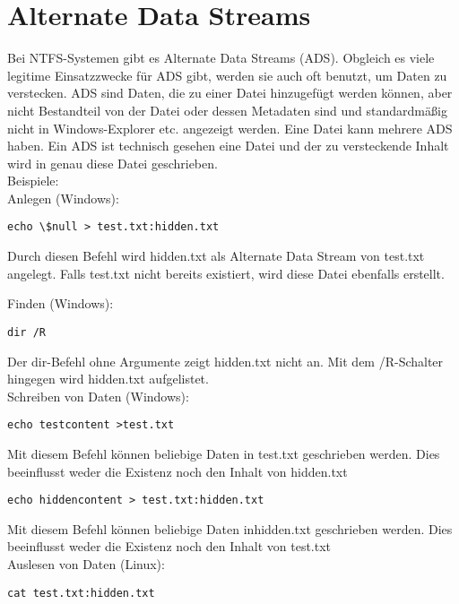 \section{Alternate Data Streams}
Bei NTFS-Systemen gibt es Alternate Data Streams (ADS). Obgleich es viele legitime Einsatzzwecke für ADS gibt, werden sie auch oft benutzt, um Daten zu verstecken. ADS sind Daten, die zu einer Datei hinzugefügt werden können, aber nicht Bestandteil von der Datei oder dessen Metadaten sind und standardmäßig nicht in Windows-Explorer etc. angezeigt werden. Eine Datei kann mehrere ADS haben. Ein ADS ist technisch gesehen eine Datei und der zu versteckende Inhalt wird in genau diese Datei geschrieben.\\
Beispiele:\\

Anlegen (Windows):\\

\begin{lstlisting}
echo \$null > test.txt:hidden.txt
\end{lstlisting}
Durch diesen Befehl wird hidden.txt als Alternate Data Stream von test.txt angelegt. Falls test.txt nicht bereits existiert, wird diese Datei ebenfalls erstellt.

Finden (Windows):\\

\begin{lstlisting}
dir /R
\end{lstlisting}
Der dir-Befehl ohne Argumente zeigt hidden.txt nicht an. Mit dem /R-Schalter hingegen wird hidden.txt aufgelistet.\\

Schreiben von Daten (Windows):\\

\begin{lstlisting}
echo testcontent >test.txt
\end{lstlisting}
Mit diesem Befehl können beliebige Daten in test.txt geschrieben werden. Dies beeinflusst weder die Existenz noch den Inhalt von hidden.txt\\

\begin{lstlisting}
echo hiddencontent > test.txt:hidden.txt
\end{lstlisting}
Mit diesem Befehl können beliebige Daten inhidden.txt geschrieben werden. Dies beeinflusst weder die Existenz noch den Inhalt von test.txt\\

Auslesen von Daten (Linux):\\
\begin{lstlisting}
cat test.txt:hidden.txt
\end{lstlisting}


